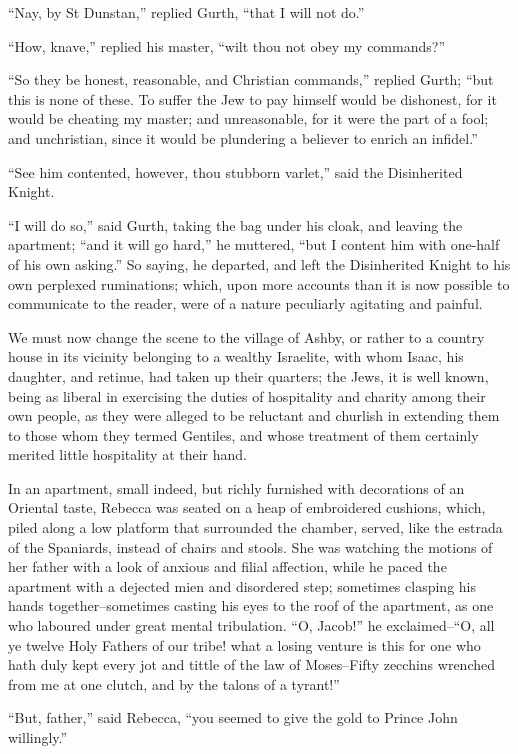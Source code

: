 ``Nay, by St Dunstan,'' replied Gurth, ``that I will not do.''

``How, knave,'' replied his master, ``wilt thou not obey my commands?''

``So they be honest, reasonable, and Christian commands,'' replied
Gurth; ``but this is none of these. To suffer the Jew to pay himself
would be dishonest, for it would be cheating my master; and
unreasonable, for it were the part of a fool; and unchristian, since it
would be plundering a believer to enrich an infidel.''

``See him contented, however, thou stubborn varlet,'' said the
Disinherited Knight.

``I will do so,'' said Gurth, taking the bag under his cloak, and
leaving the apartment; ``and it will go hard,'' he muttered, ``but I
content him with one-half of his own asking.'' So saying, he departed,
and left the Disinherited Knight to his own perplexed ruminations;
which, upon more accounts than it is now possible to communicate to the
reader, were of a nature peculiarly agitating and painful.

We must now change the scene to the village of Ashby, or rather to a
country house in its vicinity belonging to a wealthy Israelite, with
whom Isaac, his daughter, and retinue, had taken up their quarters; the
Jews, it is well known, being as liberal in exercising the duties of
hospitality and charity among their own people, as they were alleged to
be reluctant and churlish in extending them to those whom they termed
Gentiles, and whose treatment of them certainly merited little
hospitality at their hand.

In an apartment, small indeed, but richly furnished with decorations of
an Oriental taste, Rebecca was seated on a heap of embroidered cushions,
which, piled along a low platform that surrounded the chamber, served,
like the estrada of the Spaniards, instead of chairs and stools. She was
watching the motions of her father with a look of anxious and filial
affection, while he paced the apartment with a dejected mien and
disordered step; sometimes clasping his hands together--sometimes
casting his eyes to the roof of the apartment, as one who laboured under
great mental tribulation. ``O, Jacob!'' he exclaimed--``O, all ye twelve
Holy Fathers of our tribe! what a losing venture is this for one who
hath duly kept every jot and tittle of the law of Moses--Fifty zecchins
wrenched from me at one clutch, and by the talons of a tyrant!''

``But, father,'' said Rebecca, ``you seemed to give the gold to Prince
John willingly.''

